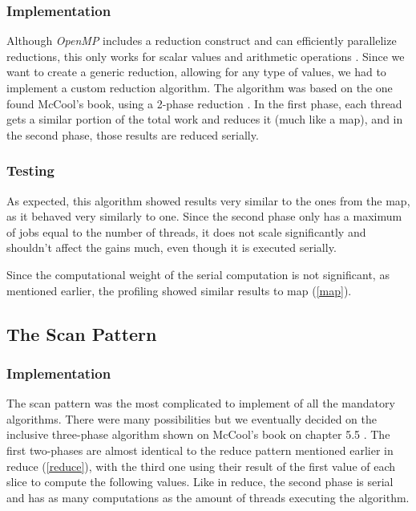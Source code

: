 \documentclass[10pt,journal]{IEEEtran}
\begin{document}
\subsubsection{Implementation}

Although \textit{OpenMP} includes a reduction construct and can efficiently parallelize reductions, this only works for scalar values and arithmetic operations \cite{ompreduct}. Since we want to create a generic reduction, allowing for any type of values, we had to implement a custom reduction algorithm. The algorithm was based on the one found McCool's book, using a 2-phase reduction \cite{mccool}. In the first phase, each thread gets a similar portion of the total work and reduces it (much like a map), and in the second phase, those results are reduced serially. 

\subsubsection{Testing}

As expected, this algorithm showed results very similar to the ones from the map, as it behaved very similarly to one. Since the second phase only has a maximum of jobs equal to the number of threads, it does not scale significantly and shouldn't affect the gains much, even though it is executed serially.

Since the computational weight of the serial computation is not significant, as mentioned earlier, the profiling showed similar results to map (\ref{map}).

\subsection{The Scan Pattern}
\label{scan}

\subsubsection{Implementation}

The scan pattern was the most complicated to implement of all the mandatory algorithms. There were many possibilities but we eventually decided on the inclusive three-phase algorithm shown on McCool's book on chapter 5.5 \cite{mccool}. The first two-phases are almost identical to the reduce pattern mentioned earlier in reduce (\ref{reduce}), with the third one using their result of the first value of each slice to compute the following values. Like in reduce, the second phase is serial and has as many computations as the amount of threads executing the algorithm. 
\end{document}
